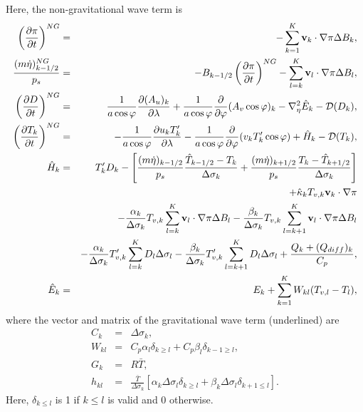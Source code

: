Here, the non-gravitational wave term is
\begin{eqnarray}
  \left( \frac{\partial \pi}{\partial t} \right)^{NG}
   &=&   - \sum_{k=1}^{K} {\mathbf{v}}_{k} \cdot \nabla \pi
       \Delta B_{k}, \\
  \frac{(m\dot{\eta})^{NG}_{k-1/2}}{p_s}
 &=& - B_{k-1/2} \left( \frac{\partial \pi}{\partial t} \right)^{NG}
   - \sum_{l=k}^{K} {\mathbf{v}}_{l} \cdot \nabla \pi
       \Delta B_{l}, \\
  \left( \frac{\partial D}{\partial t} \right)^{NG}
       &=&   \frac{1}{a\cos\varphi}
            \frac{\partial (A_u)_{k}}{\partial \lambda}
          + \frac{1}{a\cos\varphi}
            \frac{\partial }{\partial \varphi} (A_v \cos\varphi)_k
          - \nabla^{2}_{\eta} \hat{E}_{k}
          - {\mathcal D}(D_{k}), \\
  \left( \frac{\partial T_{k}}{\partial t} \right)^{NG}
      &=&   - \frac{1}{a\cos\varphi}
               \frac{\partial u_k T'_k}{\partial \lambda}
          - \frac{1}{a\cos\varphi}
               \frac{\partial }{\partial \varphi} (v_k T'_k \cos\varphi)
          + \hat{H}_{k}
          - {\mathcal D}(T_{k}), \\
 \hat{H}_k  &=&  T_{k}^{\prime} D_{k} - \left[   \frac{(m\dot{\eta})_{k-1/2}}{p_s} \frac{\hat{T}_{k-1/2} - T_k}{\Delta\sigma_k}
               + \frac{(m\dot{\eta})_{k+1/2}}{p_s} \frac{T_k - \hat{T}_{k+1/2}}{\Delta\sigma_k} \right] \notag\\
         &&+ \hat{\kappa}_{k} T_{v,k} {\mathbf{v}}_{k} \cdot \nabla \pi \notag\\
         &&- \frac{\alpha_{k}}{\Delta \sigma_{k} } T_{v,k}
             \sum_{l=k}^{K} {\mathbf{v}}_{l} \cdot \nabla \pi
               \Delta B_{l}
           - \frac{\beta_{k}}{\Delta \sigma_{k} } T_{v,k}
             \sum_{l=k+1}^{K} {\mathbf{v}}_{l} \cdot \nabla \pi
               \Delta B_{l} \notag\\
        &&- \frac{\alpha_{k}}{\Delta \sigma_{k} } T'_{v,k}
             \sum_{l=k}^{K} D_l  \Delta \sigma_{l}
           - \frac{\beta_{k}}{\Delta \sigma_{k} } T'_{v,k}
             \sum_{l=k+1}^{K} D_l  \Delta \sigma_{l}
         + \frac{Q_k + (Q_{diff})_k}{C_p}, \\
  \hat{E}_k &=& E_{k}
            + \sum_{k=1}^{K} W_{kl} ( T_{v,l}-T_{l} ),
\end{eqnarray}
where the vector and matrix of the gravitational wave term (underlined)
are
\begin{eqnarray}
  C_{k} &=& \Delta \sigma_{k}, \\
  W_{kl} &=& C_{p} \alpha_{l} \delta_{k \geq l}
         + C_{p} \beta_{l} \delta_{k-1 \geq l}, \\
  G_{k} &=& R\bar{T}, \\
h_{kl} &=& \frac{\bar{T}}{\Delta\sigma_k}\left[\alpha_k \Delta\sigma_l \delta_{k\ge l}+\beta_k \Delta\sigma_l \delta_{k+1\le l}\right].
\end{eqnarray}
Here, \(\delta_{k \leq l}\) is 1 if \(k \leq l\) is valid and 0
otherwise.\\


